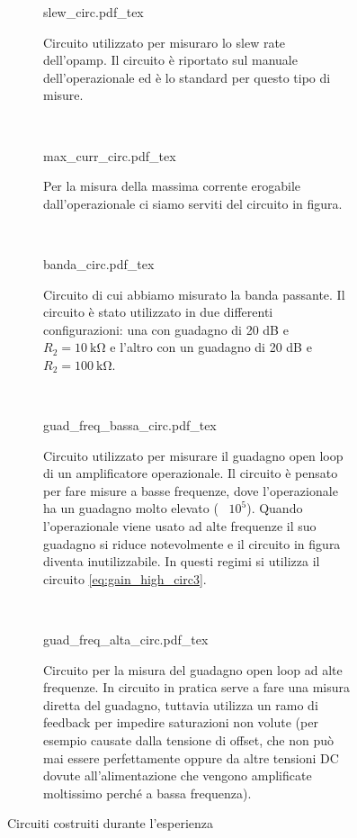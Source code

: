 \begin{figure*}[t]
        \centering
        \small
        \begin{subfigure}[b]{0.32\textwidth}
            \def\svgwidth{\columnwidth}
            {slew_circ.pdf_tex}
            \caption{Circuito utilizzato per misuraro lo slew rate dell'opamp. Il circuito è
		riportato sul manuale dell'operazionale ed è lo standard per questo tipo di misure.}
            \label{fig:slew_circ3}
        \end{subfigure}
        ~
        \begin{subfigure}[b]{0.32\textwidth}
            \def\svgwidth{\columnwidth}
            {max_curr_circ.pdf_tex}
            \caption{Per la misura della massima corrente erogabile dall'operazionale ci siamo
		serviti del circuito in figura.}
            \label{fig:max_curr_circ3}
        \end{subfigure}
        ~
        \begin{subfigure}[b]{0.32\textwidth}
            \def\svgwidth{\columnwidth}
            {banda_circ.pdf_tex}
            \caption{Circuito di cui abbiamo misurato la banda passante. Il circuito è stato utilizzato
		in due differenti configurazioni: una con guadagno di 20 dB e $R_2 = \SI{10}{\kilo\ohm}$
		e l'altro con un guadagno di 20 dB e $R_2 = \SI{100}{\kilo\ohm}$.}
            \label{fig:banda_circ3}
        \end{subfigure}
        ~
        \begin{subfigure}[b]{0.32\textwidth}
            \def\svgwidth{\columnwidth}
	    \vspace{0.5cm}
            {guad_freq_bassa_circ.pdf_tex}
	    \vspace{0pt}
            \caption{Circuito utilizzato per misurare il guadagno open loop di un amplificatore
		operazionale. Il circuito è pensato per fare misure a basse frequenze, dove
		l'operazionale ha un guadagno molto elevato (~ $10^5$). Quando l'operazionale viene
		usato ad alte frequenze il suo guadagno si riduce notevolmente e il circuito in figura
		diventa inutilizzabile. In questi regimi si utilizza il circuito \ref{eq:gain_high_circ3}.}
            \label{fig:gain_low_circ3}
        \end{subfigure}
        ~
        \begin{subfigure}[b]{0.32\textwidth}
            \def\svgwidth{\columnwidth}
            {guad_freq_alta_circ.pdf_tex}
	    \vspace{0pt}
            \caption{Circuito per la misura del guadagno open loop ad alte frequenze. In circuito in pratica
		serve a fare una misura diretta del guadagno, tuttavia utilizza un ramo di feedback per impedire
		saturazioni non volute (per esempio causate dalla tensione di offset, che non può mai essere
		perfettamente oppure da altre tensioni DC dovute all'alimentazione che vengono amplificate moltissimo
		perché a bassa frequenza).}
            \label{fig:gain_high_circ3}
        \end{subfigure}

        \caption{Circuiti costruiti durante l'esperienza}
        \label{fig:circuits3}
\end{figure*}
